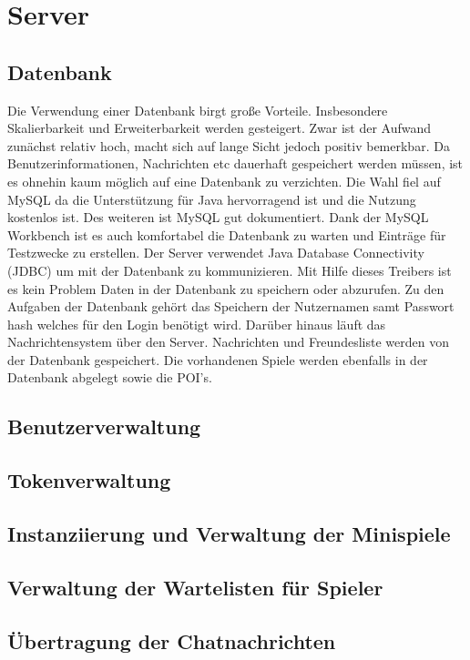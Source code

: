 \chapter{Server}
\section{Datenbank}
Die Verwendung einer Datenbank birgt große Vorteile. Insbesondere Skalierbarkeit und Erweiterbarkeit werden gesteigert. Zwar ist der Aufwand zunächst relativ hoch, macht sich auf lange Sicht jedoch positiv bemerkbar. Da Benutzerinformationen, Nachrichten etc dauerhaft gespeichert werden müssen, ist es ohnehin kaum möglich auf eine Datenbank zu verzichten. 
Die Wahl fiel auf MySQL da die Unterstützung für Java hervorragend ist und die Nutzung kostenlos ist. Des weiteren ist MySQL gut dokumentiert. Dank der MySQL Workbench ist es auch komfortabel die Datenbank zu warten und Einträge für Testzwecke zu erstellen.
Der Server verwendet Java Database Connectivity (JDBC) um mit der Datenbank zu kommunizieren. Mit Hilfe dieses Treibers ist es kein Problem Daten in der Datenbank zu speichern oder abzurufen.
Zu den Aufgaben der Datenbank gehört das Speichern der Nutzernamen samt Passwort hash welches für den Login benötigt wird. Darüber hinaus läuft das Nachrichtensystem über den Server. Nachrichten und Freundesliste werden von der Datenbank gespeichert. Die vorhandenen Spiele werden ebenfalls in der Datenbank abgelegt sowie die POI's.

\section{Benutzerverwaltung}

\section{Tokenverwaltung}

\section{Instanziierung und Verwaltung der Minispiele}

\section{Verwaltung der Wartelisten für Spieler}

\section{Übertragung der Chatnachrichten}
